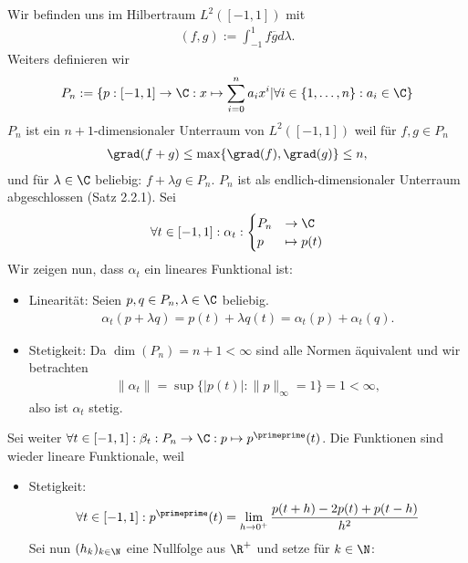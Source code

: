 \begin{solution}
Wir befinden uns im Hilbertraum $L^2([-1,1])$ mit
\begin{align*}
  (f,g) := \int_{-1}^1 f\overline{g} d\lambda.
\end{align*}
Weiters definieren wir
\begin{align*}
  P_n:= \{p: [-1,1] \to \C: x \mapsto \sum_{i=0}^n a_ix^i | \forall i \in
  \{1,\dots,n\}: a_i \in \C\}
\end{align*}
$P_n$ ist ein $n+1$-dimensionaler Unterraum von $L^2([-1,1])$ weil für $f,g \in P_n$
\begin{align*}
  \grad(f+g) \leq \max\{\grad(f), \grad(g)\} \leq n,
\end{align*}
und für $\lambda \in \C$ beliebig: $f + \lambda g \in P_n$.
$P_n$ ist als endlich-dimensionaler Unterraum abgeschlossen (Satz 2.2.1).
Sei
\begin{align*}
  \forall t \in [-1,1]: \alpha_t: \begin{cases}
    P_n &\to \C \\
    p &\mapsto p(t)
  \end{cases}
\end{align*}
Wir zeigen nun, dass $\alpha_t$ ein lineares Funktional ist:
\begin{itemize}
  \item Linearität: Seien $p,q \in P_n, \lambda \in \C$ beliebig.
  \begin{align*}
    \alpha_t(p + \lambda q) = p(t) + \lambda q(t) = \alpha_t(p) + \alpha_t(q).
  \end{align*}
  \item Stetigkeit: Da $\dim(P_n) = n + 1 < \infty$ sind alle Normen äquivalent
  und wir betrachten
  \begin{align*}
    \|\alpha_t\| = \sup\{|p(t)|: \|p\|_{\infty} = 1\} = 1 < \infty,
  \end{align*}
  also ist $\alpha_t$ stetig.
\end{itemize}
Sei weiter $\forall t \in [-1,1]: \beta_t : P_n \to \C: p \mapsto p^{\primeprime}(t)$.
Die Funktionen sind wieder lineare Funktionale, weil
\begin{itemize}
  \item Stetigkeit:
  \begin{align*}
    \forall t \in [-1,1]: p^{\primeprime}(t) = \lim_{h \to 0^+}\frac{p(t+h) - 2p(t) + p(t-h)}{h^2}
  \end{align*}
  Sei nun $(h_k)_{k \in \N}$ eine Nullfolge aus $\R^+$ und setze für $k \in \N$:
  \begin{align*}

\end{align*}
\end{itemize}
\end{solution}

